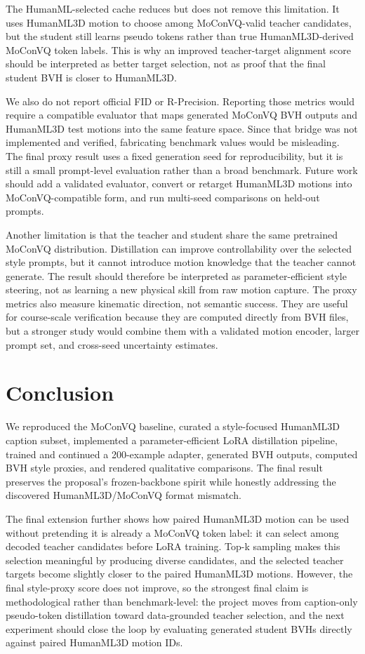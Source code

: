 \documentclass[conference]{IEEEtran}
\begin{document}
The HumanML-selected cache reduces but does not remove this limitation. It uses HumanML3D motion to choose among MoConVQ-valid teacher candidates, but the student still learns pseudo tokens rather than true HumanML3D-derived MoConVQ token labels. This is why an improved teacher-target alignment score should be interpreted as better target selection, not as proof that the final student BVH is closer to HumanML3D.

We also do not report official FID or R-Precision. Reporting those metrics would require a compatible evaluator that maps generated MoConVQ BVH outputs and HumanML3D test motions into the same feature space. Since that bridge was not implemented and verified, fabricating benchmark values would be misleading. The final proxy result uses a fixed generation seed for reproducibility, but it is still a small prompt-level evaluation rather than a broad benchmark. Future work should add a validated evaluator, convert or retarget HumanML3D motions into MoConVQ-compatible form, and run multi-seed comparisons on held-out prompts.

Another limitation is that the teacher and student share the same pretrained MoConVQ distribution. Distillation can improve controllability over the selected style prompts, but it cannot introduce motion knowledge that the teacher cannot generate. The result should therefore be interpreted as parameter-efficient style steering, not as learning a new physical skill from raw motion capture. The proxy metrics also measure kinematic direction, not semantic success. They are useful for course-scale verification because they are computed directly from BVH files, but a stronger study would combine them with a validated motion encoder, larger prompt set, and cross-seed uncertainty estimates.

\section{Conclusion}
We reproduced the MoConVQ baseline, curated a style-focused HumanML3D caption subset, implemented a parameter-efficient LoRA distillation pipeline, trained and continued a 200-example adapter, generated BVH outputs, computed BVH style proxies, and rendered qualitative comparisons. The final result preserves the proposal's frozen-backbone spirit while honestly addressing the discovered HumanML3D/MoConVQ format mismatch.

The final extension further shows how paired HumanML3D motion can be used without pretending it is already a MoConVQ token label: it can select among decoded teacher candidates before LoRA training. Top-k sampling makes this selection meaningful by producing diverse candidates, and the selected teacher targets become slightly closer to the paired HumanML3D motions. However, the final style-proxy score does not improve, so the strongest final claim is methodological rather than benchmark-level: the project moves from caption-only pseudo-token distillation toward data-grounded teacher selection, and the next experiment should close the loop by evaluating generated student BVHs directly against paired HumanML3D motion IDs.



\end{document}
